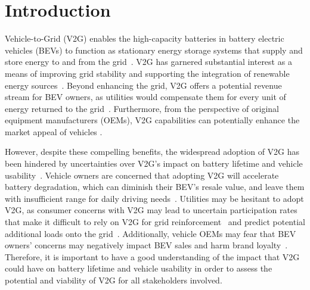 \documentclass[pdflatex,sn-nature]{sn-jnl}%
\theoremstyle{thmstyleone}%
\theoremstyle{thmstyletwo}%
\theoremstyle{thmstylethree}%
\begin{document}
\section{Introduction}\label{sec1}

Vehicle-to-Grid (V2G) enables the high-capacity batteries in battery electric vehicles (BEVs) to function as stationary energy storage systems that supply and store energy to and from the grid~\cite{kempton1997electric}. V2G has garnered substantial interest as a means of improving grid stability and supporting the integration of renewable energy sources~\cite{xu2023electric, lenka2021grid, yang_2024}. Beyond enhancing the grid, V2G offers a potential revenue stream for BEV owners, as utilities would compensate them for every unit of energy returned to the grid~\cite{kempton2005vehicle, zheng2023modeling}. Furthermore, from the perspective of original equipment manufacturers (OEMs), V2G capabilities can potentially enhance the market appeal of vehicles \cite{sovacool2018neglected, rao_2025_review}.

However, despite these compelling benefits, the widespread adoption of V2G has been hindered by uncertainties over V2G's impact on battery lifetime and vehicle usability~\cite{goncearuc2024barriers, Monica_AutoUI}. Vehicle owners are concerned that adopting V2G will accelerate battery degradation, which can diminish their BEV’s resale value, and leave them with insufficient range for daily driving needs~\cite{Monica_AutoUI, GESKE_driver_concerns_V2G, huang2021electric_EV_driver_concerns}. Utilities may be hesitant to adopt V2G, as consumer concerns with V2G may lead to uncertain participation rates that make it difficult to rely on V2G for grid reinforcement~\cite{goncearuc2024barriers} and predict potential additional loads onto the grid~\cite{li2021coordinating}. Additionally, vehicle OEMs may fear that BEV owners' concerns may negatively impact BEV sales and harm brand loyalty~\cite{goncearuc2024barriers}. Therefore, it is important to have a good understanding of the impact that V2G could have on battery lifetime and vehicle usability in order to assess the potential and viability of V2G for all stakeholders involved.
\end{document}
